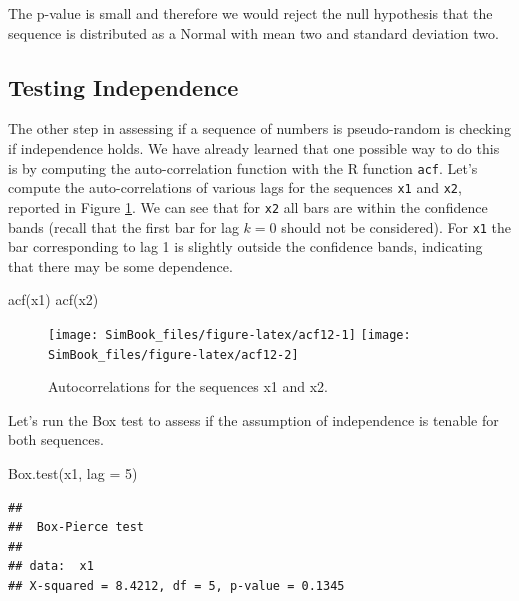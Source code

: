 \documentclass[
]{book}
\newenvironment{Shaded}{\begin{snugshade}}{\end{snugshade}}
\newcommand{\AttributeTok}[1]{\textcolor[rgb]{0.77,0.63,0.00}{#1}}
\newcommand{\DecValTok}[1]{\textcolor[rgb]{0.00,0.00,0.81}{#1}}
\newcommand{\FunctionTok}[1]{\textcolor[rgb]{0.00,0.00,0.00}{#1}}
\newcommand{\NormalTok}[1]{#1}
\begin{document}
The p-value is small and therefore we would reject the null hypothesis that the sequence is distributed as a Normal with mean two and standard deviation two.

\hypertarget{testing-independence-1}{%
\subsection{Testing Independence}\label{testing-independence-1}}

The other step in assessing if a sequence of numbers is pseudo-random is checking if independence holds. We have already learned that one possible way to do this is by computing the auto-correlation function with the R function \texttt{acf}. Let's compute the auto-correlations of various lags for the sequences \texttt{x1} and \texttt{x2}, reported in Figure \ref{fig:acf12}. We can see that for \texttt{x2} all bars are within the confidence bands (recall that the first bar for lag \(k=0\) should not be considered). For \texttt{x1} the bar corresponding to lag 1 is slightly outside the confidence bands, indicating that there may be some dependence.

\begin{Shaded}
\begin{Highlighting}[]
\FunctionTok{acf}\NormalTok{(x1)}
\FunctionTok{acf}\NormalTok{(x2)}
\end{Highlighting}
\end{Shaded}

\begin{figure}

{\centering \texttt{[image: SimBook\_files/figure-latex/acf12-1]} \texttt{[image: SimBook\_files/figure-latex/acf12-2]} 

}

\caption{Autocorrelations for the sequences x1 and x2.}\label{fig:acf12}
\end{figure}

Let's run the Box test to assess if the assumption of independence is tenable for both sequences.

\begin{Shaded}
\begin{Highlighting}[]
\FunctionTok{Box.test}\NormalTok{(x1, }\AttributeTok{lag =} \DecValTok{5}\NormalTok{)}
\end{Highlighting}
\end{Shaded}

\begin{verbatim}
## 
##  Box-Pierce test
## 
## data:  x1
## X-squared = 8.4212, df = 5, p-value = 0.1345
\end{verbatim}
\end{document}
